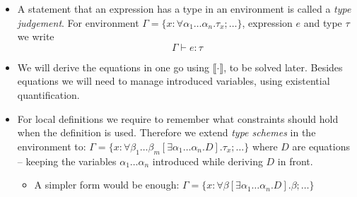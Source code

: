 \documentclass{beamer}
\newcommand{\tmem}[1]{{\em #1\/}}
\begin{document}
\begin{itemize}
  \item A statement that an expression has a type in an environment is called
  a {\tmem{type judgement}}. For environment $\Gamma = \{ x : \forall \alpha_1
  \ldots \alpha_n . \tau_x ; \ldots \}$, expression $e$ and type $\tau$ we
  write
  \[ \Gamma \vdash e : \tau \]
  \item We will derive the equations in one go using $\llbracket \cdot
  \rrbracket$, to be solved later. Besides equations we will need to manage
  introduced variables, using existential quantification.
  
  \item For local definitions we require to remember what constraints should
  hold when the definition is used. Therefore we extend {\tmem{type schemes}}
  in the environment to: $\Gamma = \{ x : \forall \beta_1 \ldots \beta_m
  [\exists \alpha_1 \ldots \alpha_n .D] . \tau_x ; \ldots \}$ where $D$ are
  equations -- keeping the variables $\alpha_1 \ldots \alpha_n$ introduced
  while deriving $D$ in front.
  \begin{itemize}
    \item A simpler form would be enough: $\Gamma = \{ x : \forall \beta
    [\exists \alpha_1 \ldots \alpha_n .D] . \beta ; \ldots \}$
  \end{itemize}
\end{itemize}
\end{document}
